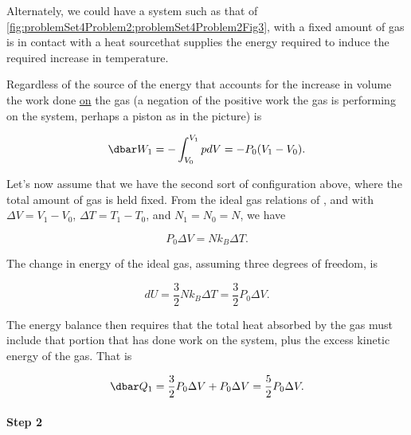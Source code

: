 {Alternately, we could have a system such as that of \cref{fig:problemSet4Problem2:problemSet4Problem2Fig3}, with a fixed amount of gas is in contact with a heat sourcethat supplies the energy required to induce the required increase in temperature.


Regardless of the source of the energy that accounts for the increase in volume the work done \underline{on} the gas (a negation of the positive work the gas is performing on the system, perhaps a piston as in the picture) is

\begin{equation}\label{eqn:basicStatMechProblemSet4Problem2:60}
\dbar W_1 = - \int_{V_0}^{V_1} p dV = -P_0 (V_1 - V_0).
\end{equation}

Let's now assume that we have the second sort of configuration above, where the total amount of gas is held fixed.  From the ideal gas relations of , and with $\Delta V = V_1 - V_0$, $\Delta T = T_1 - T_0$, and $N_1 = N_0 = N$, we have

\begin{equation}\label{eqn:basicStatMechProblemSet4Problem2:80}
P_0 \Delta V = N k_B \Delta T.
\end{equation}

The change in energy of the ideal gas, assuming three degrees of freedom, is

\begin{equation}\label{eqn:basicStatMechProblemSet4Problem2:100}
d U = \frac{3}{2} N k_B \Delta T = \frac{3}{2} P_0 \Delta V.
\end{equation}

The energy balance then requires that the total heat absorbed by the gas must include that portion that has done work on the system, plus the excess kinetic energy of the gas.  That is

\begin{equation}\label{eqn:basicStatMechProblemSet4Problem2:120}
\dbar Q_1 = \frac{3}{2} P_0 \Delta V + P_0 \Delta V = \frac{5}{2} P_0 \Delta V.
\end{equation}

\paragraph{Step 2}

}
